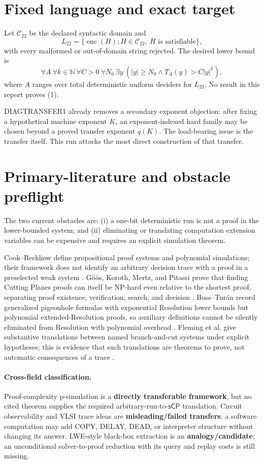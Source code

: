 \documentclass[11pt]{article}
\newcommand{\Ltwo}{L_{22}}
\newcommand{\sCP}{\mathsf{sCP}}
\begin{document}
\section{Fixed language and exact target}
Let \(\mathcal C_{22}\) be the declared syntactic domain and
\[
 \Ltwo=\{\operatorname{enc}(H):H\in\mathcal C_{22},\ H\text{ is satisfiable}\},
\]
with every malformed or out-of-domain string rejected.  The desired lower
bound is
\[
 \forall A\ \forall k\in\mathbb N\ \forall C>0\ \forall N_0\
 \exists y\ (|y|\ge N_0\land T_A(y)>C|y|^k),                 \tag{1}
\]
where \(A\) ranges over total deterministic uniform deciders for \(\Ltwo\).
No result in this report proves (1).

DIAGTRANSFER1 already removes a secondary exponent objection: after fixing a
hypothetical machine exponent \(K\), an exponent-indexed hard family may be
chosen beyond a proved transfer exponent \(q(K)\).  The load-bearing issue is
the transfer itself.  This run attacks the most direct construction of that
transfer.

\section{Primary-literature and obstacle preflight}
The two current obstacles are: (i) a one-bit deterministic run is not a proof
in the lower-bounded system; and (ii) eliminating or translating computation
extension variables can be expensive and requires an explicit simulation
theorem.

Cook--Reckhow define propositional proof systems and polynomial simulations;
their framework does not identify an arbitrary decision trace with a proof in
a preselected weak system \cite{cookreckhow,krajicek}.  G\"o\"os, Koroth,
Mertz, and Pitassi prove that finding Cutting Planes proofs can itself be
NP-hard even relative to the shortest proof, separating proof existence,
verification, search, and decision \cite{gkmp}.  Buss--Tur\'an record
generalized pigeonhole formulas with exponential Resolution lower bounds but
polynomial extended-Resolution proofs, so auxiliary definitions cannot be
silently eliminated from Resolution with polynomial overhead
\cite{bussturan}.  Fleming et al. give substantive translations between named
branch-and-cut systems under explicit hypotheses; this is evidence that such
translations are theorems to prove, not automatic consequences of a trace
\cite{fleming}.

\paragraph{Cross-field classification.}
Proof-complexity p-simulation is a \textbf{directly transferable framework},
but no cited theorem supplies the required arbitrary-run-to-\(\sCP\)
translation.  Circuit observability and VLSI trace ideas are
\textbf{misleading/failed transfers}: a software computation may add COPY,
DELAY, DEAD, or interpreter structure without changing its answer.  LWE-style
black-box extraction is an \textbf{analogy/candidate}; an unconditional
solver-to-proof reduction with its query and replay costs is still missing.
\end{document}
